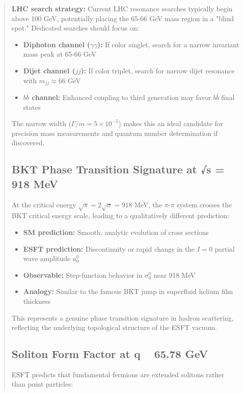 ﻿\documentclass[twocolumn,prd,amsmath,amssymb,aps]{revtex4-2}
\begin{document}
\begin{abstract}
\textbf{LHC search strategy:} Current LHC resonance searches typically begin above 100 GeV, potentially placing the 65-66 GeV mass region in a "blind spot." Dedicated searches should focus on:
\begin{itemize}
\item \textbf{Diphoton channel ($\gamma\gamma$):} If color singlet, search for a narrow invariant mass peak at 65-66 GeV
\item \textbf{Dijet channel ($jj$):} If color triplet, search for narrow dijet resonance with $m_{jj} \approx 66$ GeV
\item \textbf{$b\bar{b}$ channel:} Enhanced coupling to third generation may favor $b\bar{b}$ final states
\end{itemize}

The narrow width ($\Gamma/m = 5 \times 10^{-5}$) makes this an ideal candidate for precision mass measurements and quantum number determination if discovered.

\subsection{BKT Phase Transition Signature at √s = 918 MeV}

At the critical energy $\sqrt{s} = 2\sqrt{\sigma} = 918$ MeV, the $\pi$-$\pi$ system crosses the BKT critical energy scale, leading to a qualitatively different prediction:

\begin{itemize}
\item \textbf{SM prediction:} Smooth, analytic evolution of cross sections
\item \textbf{ESFT prediction:} Discontinuity or rapid change in the $I=0$ partial wave amplitude $a_0^0$
\item \textbf{Observable:} Step-function behavior in $\sigma_0^0$ near 918 MeV
\item \textbf{Analogy:} Similar to the famous BKT jump in superfluid helium film thickness
\end{itemize}

This represents a genuine phase transition signature in hadron scattering, reflecting the underlying topological structure of the ESFT vacuum.

\subsection{Soliton Form Factor at q ~ 65.78 GeV}

ESFT predicts that fundamental fermions are extended solitons rather than point particles:


\end{abstract}
\end{document}
